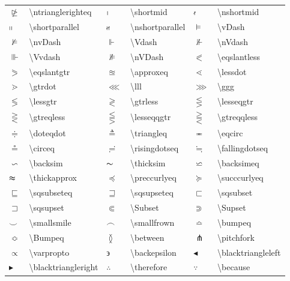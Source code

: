\documentclass[UTF8,fontset=ubuntu]{ctexart}
\begin{document}
\begin{table}[H]
\begin{tabular}{l l l l l l}
		$\ntrianglerighteq$ & \textbackslash ntrianglerighteq & $\shortmid$ & \textbackslash shortmid & $\nshortmid$ & \textbackslash nshortmid\\
		$\shortparallel$ & \textbackslash shortparallel & $\nshortparallel$ & \textbackslash nshortparallel & $\vDash$ & \textbackslash vDash \\
		$\nvDash$ & \textbackslash nvDash & $\Vdash$ & \textbackslash Vdash & $\nVdash$ & \textbackslash nVdash\\
		$\Vvdash$ & \textbackslash Vvdash & $\nVDash$ & \textbackslash nVDash &	$\eqslantless$ & \textbackslash eqslantless\\
		$\eqslantgtr$ & \textbackslash eqslantgtr & $\approxeq$ & \textbackslash approxeq & $\lessdot$ & \textbackslash lessdot\\
		$\gtrdot$ & \textbackslash gtrdot & $\lll$ & \textbackslash lll & $\ggg$ & \textbackslash ggg \\
		$\lessgtr$ & \textbackslash lessgtr & $\gtrless$ & \textbackslash gtrless & $\lesseqgtr$ & \textbackslash lesseqgtr \\
		$\gtreqless$ & \textbackslash gtreqless & $\lesseqqgtr$ & \textbackslash lesseqqgtr & $\gtreqqless$ & \textbackslash gtreqqless \\
		$\doteqdot$ & \textbackslash doteqdot & $\triangleq$ & \textbackslash triangleq & $\eqcirc$ & \textbackslash eqcirc\\
		$\circeq$ & \textbackslash circeq & $\risingdotseq$ & \textbackslash risingdotseq & $\fallingdotseq$ & \textbackslash fallingdotseq\\
		$\backsim$ & \textbackslash backsim & $\thicksim$ & \textbackslash thicksim & $\backsimeq$ & \textbackslash backsimeq\\
		$\thickapprox$ & \textbackslash thickapprox & $\preccurlyeq$ & \textbackslash preccurlyeq & $\succcurlyeq$ & \textbackslash succcurlyeq\\
		$\sqsubseteq$ & \textbackslash sqsubseteq & $\sqsupseteq$ & \textbackslash sqsupseteq & $\sqsubset$ & \textbackslash sqsubset\\
		$\sqsupset$ & \textbackslash sqsupset & $\Subset$ & \textbackslash Subset & $\Supset$ & \textbackslash Supset\\
		$\smallsmile$ & \textbackslash smallsmile &	$\smallfrown$ & \textbackslash smallfrown & $\bumpeq$ & \textbackslash bumpeq\\
		$\Bumpeq$ & \textbackslash Bumpeq & $\between$ & \textbackslash between & $\pitchfork$ & \textbackslash pitchfork\\
		$\varpropto$ & \textbackslash varpropto & $\backepsilon$ & \textbackslash backepsilon & $\blacktriangleleft$ & \textbackslash blacktriangleleft\\
		$\blacktriangleright$ & \textbackslash blacktriangleright & $\therefore$ & \textbackslash therefore & $\because$ & \textbackslash because\\\hline
	\end{tabular}
	\caption{}
\end{table}
\end{document}
